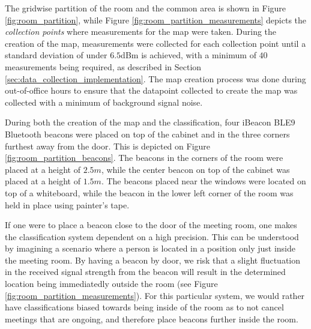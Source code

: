 The gridwise partition of the room and the common area is shown in Figure \ref{fig:room_partition}, while Figure \ref{fig:room_partition_measurements} depicts the \textit{collection points} where measurements for the map were taken.
During the creation of the map, measurements were collected for each collection point until a standard deviation of under $6.5$dBm is achieved, with a minimum of $40$ measurements being required, as described in Section \ref{sec:data_collection_implementation}.
The map creation process was done during out-of-office hours to ensure that the datapoint collected to create the map was collected with a minimum of background signal noise.

During both the creation of the map and the classification, four iBeacon BLE9 Bluetooth beacons \cite{BluetoothiBeaconBLE9} were placed on top of the cabinet and in the three corners furthest away from the door. This is depicted on Figure \ref{fig:room_partition_beacons}.
The beacons in the corners of the room were placed at a height of $2.5m$, while the center beacon on top of the cabinet was placed at a height of $1.5m$.
The beacons placed near the windows were located on top of a whiteboard, while the beacon in the lower left corner of the room was held in place using painter's tape.

If one were to place a beacon close to the door of the meeting room, one makes the classification system dependent on a high precision.
This can be understood by imagining a scenario where a person is located in a position only just inside the meeting room.
By having a beacon by door, we risk that a slight fluctuation in the received signal strength from the beacon will result in the determined location being immediatedly outside the room (see Figure \ref{fig:room_partition_measurements}).
For this particular system, we would rather have classifications biased towards being inside of the room as to not cancel meetings that are ongoing, and therefore place beacons further inside the room.